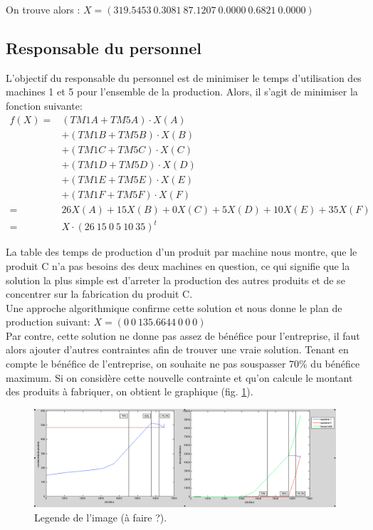 \documentclass[a4paper, 11pt]{article}
\begin{document}
On trouve alors : $ X = (319.5453 ~0.3081 ~87.1207 ~0.0000 ~0.6821 ~0.0000) $

\subsection{Responsable du personnel}
L’objectif du responsable du personnel est de minimiser le temps d’utilisation
des machines 1 et 5 pour l’ensemble de la production. Alors, il s’agit de
minimiser la fonction suivante:\\

$$
\begin{array}{rl}
    f(X) = & (TM1A + TM5A)\cdot X(A) \\
           & + (TM1B + TM5B)\cdot X(B) \\
           & + (TM1C + TM5C)\cdot X(C) \\
           & + (TM1D + TM5D)\cdot X(D) \\
           & + (TM1E + TM5E)\cdot X(E) \\
           & + (TM1F + TM5F)\cdot X(F) \\
    = & 26X(A) + 15X(B) + 0X(C) + 5X(D) + 10X(E) + 35X(F) \\
    = & X\cdot (26~15~0~5~10~35)^t
\end{array}
$$

La table des temps de production d’un produit par machine nous montre, que le
produit C n’a pas besoins des deux machines en question, ce qui signifie que la
solution la plus simple est d’arreter la production des autres produits et de
se concentrer sur la fabrication du produit C. \\
Une approche algorithmique confirme cette solution et nous donne le plan de
production suivant: $X = (0 ~0 ~135.6644 ~0 ~0 ~0)$ \\

Par contre, cette solution ne donne pas assez de bénéfice pour l’entreprise, il
faut alors ajouter d’autres contraintes afin de trouver une vraie solution.
Tenant en compte le bénéfice de l’entreprise, on souhaite ne pas souspasser
70\% du bénéfice maximum. Si on considère cette nouvelle contrainte et qu’on
calcule le montant des produits à fabriquer, on obtient le graphique
(fig. \ref{fig_graph_personnel_temps}).

\begin{figure}[position]
    \begin{center}
        \includegraphics[scale=0.35]{graph_personnel_temps}
        \caption{
            \label{fig_graph_personnel_temps} Legende de l'image (à faire ?).
        }
    \end{center}
\end{figure}
\end{document}
